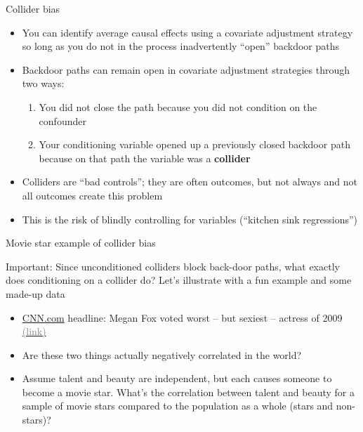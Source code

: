\documentclass{beamer}
\newcommand{\myurlshort}[2]{\href{#1}{\textcolor{gray}{\textsf{#2}}}}
\begin{document}
\begin{frame}{Collider bias}

\begin{itemize}
\item You can identify average causal effects using a covariate adjustment strategy so long as you do not in the process inadvertently ``open'' backdoor paths
\item Backdoor paths can remain open in covariate adjustment strategies through two ways:
	\begin{enumerate}
	\item You did not close the path because you did not condition on the confounder
	\item Your conditioning variable opened up a previously closed backdoor path because on that path the variable was a \textbf{collider}
	\end{enumerate}
\item Colliders are ``bad controls''; they are often outcomes, but not always and not all outcomes create this problem
\item This is the risk of blindly controlling for variables (``kitchen sink regressions'')
\end{itemize}

\end{frame}


\begin{frame}{Movie star example of collider bias}

  \alert{Important}: Since unconditioned colliders block back-door paths, what exactly does conditioning on a collider do? Let's illustrate with a fun example and some made-up data\\
  \begin{itemize}
    \item \underline{CNN.com} headline: Megan Fox voted worst -- but sexiest -- actress of 2009 \myurlshort{http://marquee.blogs.cnn.com/2009/12/30/megan-fox-voted-worst-but-sexiest-actress-of-2009/}{(link)}
    \item Are these two things actually negatively correlated in the world?
    \item Assume talent and beauty are independent, but each causes someone to become a movie star.  What's the correlation between talent and beauty for a sample of movie stars compared to the population as a whole (stars and non-stars)?
  \end{itemize}

\end{frame}
\end{document}
